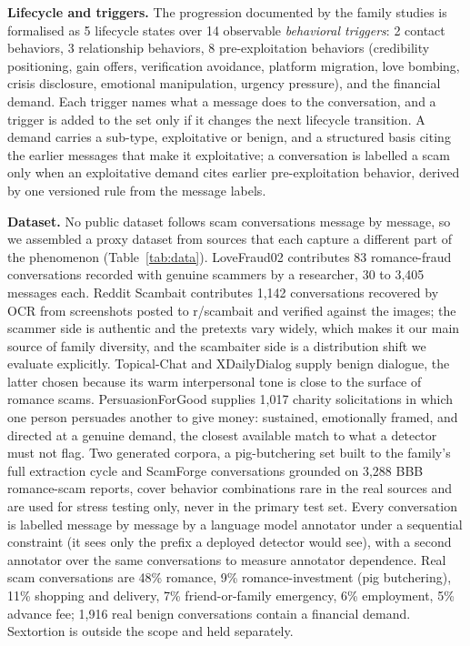 \documentclass[letterpaper,11pt]{article}
\begin{document}
\textbf{Lifecycle and triggers.} The progression documented by the
family studies is formalised as 5 lifecycle states over 14 observable
\emph{behavioral triggers}: 2 contact behaviors, 3 relationship
behaviors, 8 pre-exploitation behaviors (credibility positioning, gain
offers, verification avoidance, platform migration, love bombing,
crisis disclosure, emotional manipulation, urgency pressure), and the
financial demand. Each trigger names what a message does to the
conversation, and a trigger is added to the set only if it changes the
next lifecycle transition. A demand carries a sub-type, exploitative or
benign, and a structured basis citing the earlier messages that make
it exploitative; a conversation is labelled a scam only when an
exploitative demand cites earlier pre-exploitation behavior, derived by
one versioned rule from the message labels.

\textbf{Dataset.} No public dataset follows scam conversations message by
message, so we assembled a proxy dataset from sources that each capture
a different part of the phenomenon (Table~\ref{tab:data}). LoveFraud02
contributes 83 romance-fraud conversations recorded with genuine scammers
by a researcher, 30 to 3,405 messages each. Reddit Scambait contributes
1,142 conversations recovered by OCR from screenshots posted to
r/scambait and verified against the images; the scammer side is
authentic and the pretexts vary widely, which makes it our main source
of family diversity, and the scambaiter side is a distribution shift we
evaluate explicitly. Topical-Chat and XDailyDialog supply benign
dialogue, the latter chosen because its warm interpersonal tone is close
to the surface of romance scams. PersuasionForGood supplies 1,017
charity solicitations in which one person persuades another to give
money: sustained, emotionally framed, and directed at a genuine demand,
the closest available match to what a detector must not flag. Two
generated corpora, a pig-butchering set built to the family's full
extraction cycle and ScamForge conversations grounded on 3,288 BBB
romance-scam reports, cover behavior combinations rare in the real
sources and are used for stress testing only, never in the primary test
set. Every conversation is labelled message by message by a language
model annotator under a sequential constraint (it sees only the prefix a
deployed detector would see), with a second annotator over the same
conversations to measure annotator dependence. Real scam conversations
are 48\% romance, 9\% romance-investment (pig butchering), 11\%
shopping and delivery, 7\% friend-or-family emergency, 6\% employment,
5\% advance fee; 1,916 real benign conversations contain a financial
demand. Sextortion is outside the scope and held separately.
\end{document}
